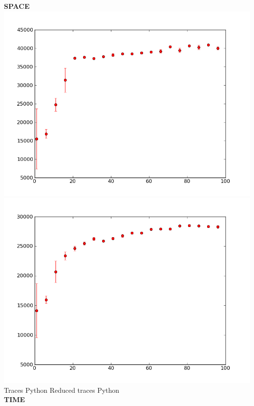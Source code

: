 \documentclass[10pt]{article}
\begin{document}
\begin{center}
{\bf SPACE} \\
\includegraphics[scale=0.4]{../graphs/CRP_mixture/CRP-mixture-model-collapsed-traces-py-memory.png} 
\includegraphics[scale=0.4]{../graphs/CRP_mixture/CRP-mixture-model-collapsed-reduced-traces-py-memory.png} \\
Traces Python \qquad \qquad \qquad\qquad\qquad\qquad \qquad Reduced traces Python \\
{\bf TIME} \\

\end{center}
\end{document}
